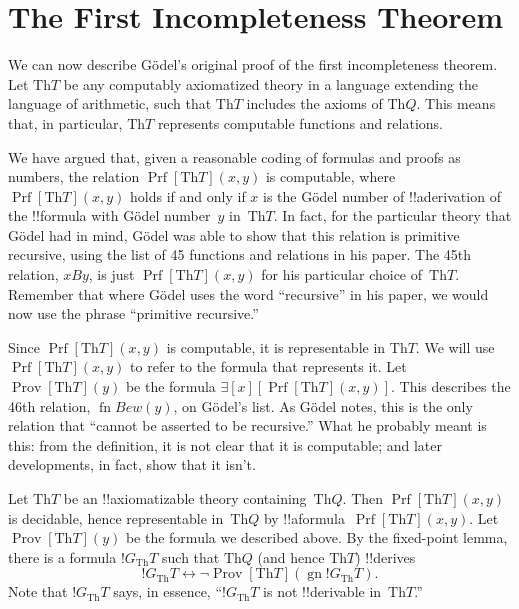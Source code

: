 \documentclass[10pt,a4paper]{article}
\theoremstyle{plain}
\theoremstyle{definition}
\theoremstyle{remark}
\newcommand*{\olfileid}[3]{}
\newcommand*{\olsection}[1]{\section*{#1}}
\newcommand*{\ollabel}[1]{\label{#1}}
\providecommand{\lexists}{\mathord{\exists}}
\providecommand{\Th}{\ensuremath{\mathrm{Th}}}
\providecommand{\Prf}{\operatorname{Prf}}
\providecommand{\gn}{\operatorname{gn}}
\providecommand{\liff}{\mathbin{\leftrightarrow}}
\providecommand{\OProv}{\operatorname{Prov}}
\providecommand{\OPrf}{\operatorname{Prf}}
\providecommand{\fn}{\operatorname{fn}}
\providecommand{\fn}{\operatorname{fn}}
\begin{document}



\olfileid{inc}{inp}{1in}

\olsection{The First Incompleteness Theorem}

We can now describe G\"odel's original proof of the first
incompleteness theorem. Let $\Th{T}$ be any computably axiomatized theory
in a language extending the language of arithmetic, such that $\Th{T}$
includes the axioms of $\Th{Q}$. This means that, in particular, $\Th{T}$
represents computable functions and relations.

We have argued that, given a reasonable coding of formulas and proofs
as numbers, the relation $\Prf[\Th{T}](x,y)$ is computable, where
$\Prf[\Th{T}](x,y)$ holds if and only if $x$ is the G\"odel number of
!!a{derivation} of the !!{formula} with G\"odel number~$y$
in~$\Th{T}$. In fact, for the particular theory that G\"odel had in
mind, G\"odel was able to show that this relation is primitive
recursive, using the list of 45 functions and relations in his
paper. The 45th relation, $x B y$, is just $\Prf[\Th{T}](x,y)$ for his
particular choice of~$\Th{T}$. Remember that where G\"odel uses the
word ``recursive'' in his paper, we would now use the phrase
``primitive recursive.''

Since $\Prf[\Th{T}](x,y)$ is computable, it is representable in $\Th{T}$. We
will use $\OPrf[\Th{T}](x,y)$ to refer to the formula that represents
it. Let $\OProv[\Th{T}](y)$ be the formula
$\lexists[x][\OPrf[\Th{T}](x,y)]$. This describes the 46th relation,
$\fn{Bew}(y)$, on G\"odel's list. As G\"odel notes, this is the only
relation that ``cannot be asserted to be recursive.''  What he
probably meant is this: from the definition, it is not clear that it
is computable; and later developments, in fact, show that it isn't.

Let $\Th{T}$ be an !!{axiomatizable} theory containing~$\Th{Q}$. Then
$\Prf[\Th{T}](x, y)$ is decidable, hence representable in~$\Th{Q}$ by
!!a{formula}~$\OPrf[\Th{T}](x, y)$. Let $\OProv[\Th{T}](y)$ be the formula we
described above. By the fixed-point lemma, there is a formula
$!G_\Th{T}$ such that $\Th{Q}$ (and hence $\Th{T}$) !!{derive}s
\begin{equation}
\ollabel{eqn:qpf}
!G_\Th{T} \liff \lnot \OProv[\Th{T}](\gn{!G_\Th{T}}).
\end{equation}
Note that $!G_\Th{T}$ says, in essence, ``$!G_\Th{T}$ is not
!!{derivable} in~$\Th{T}$.''
\end{document}
